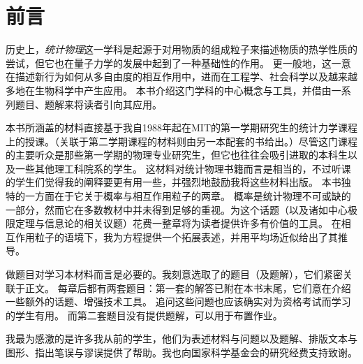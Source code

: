 \chapter{前言}

历史上，\textit{统计物理}这一学科是起源于对用物质的组成粒子来描述物质的热学性质的尝试，但它也在量子力学的发展中起到了一种基础性的作用。
更一般地，这一意在描述新行为如何从多自由度的相互作用中，进而在工程学、社会科学以及越来越多地在生物科学中产生应用。
本书介绍这门学科的中心概念与工具，并借由一系列题目、题解来将读者引向其应用。

本书所涵盖的材料直接基于我自1988年起在MIT的第一学期研究生的统计力学课程上的授课。（关联于第二学期课程的材料则由另一本配套的书给出。）尽管这门课程的主要听众是那些第一学期的物理专业研究生，但它也往往会吸引进取的本科生以及一些其他理工科院系的学生。
这材料对统计物理书籍而言是相当的，不过听课的学生们觉得我的阐释要更有用一些，并强烈地鼓励我将这些材料出版。
本书独特的一方面在于它关于概率与相互作用粒子的两章。
概率是统计物理不可或缺的一部分，然而它在多数教材中并未得到足够的重视。为这个话题（以及诸如中心极限定理与信息论的相关议题）花费一整章将为读者提供许多有价值的工具。
在相互作用粒子的语境下，我为方程提供一个拓展表述，并用平均场近似给出了其推导。

做题目对学习本材料而言是必要的。我刻意选取了的题目（及题解），它们紧密关联于正文。
每章后都有两套题目：第一套的解答已附在本书末尾，它们意在介绍一些额外的话题、增强技术工具。
追问这些问题也应该确实对为资格考试而学习的学生有用。
而第二套题目没有提供题解，可以用于布置作业。

我最为感激的是许多我从前的学生，他们为表述材料与问题以及题解、排版文本与图形、指出笔误与谬误提供了帮助。我也向国家科学基金会的研究经费支持致谢。